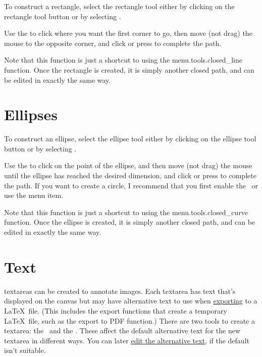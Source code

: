 To construct a rectangle, select the rectangle tool either by
clicking on the rectangle tool button or by selecting
.

Use the  to click where
you want the first corner to go, then move (not drag) the mouse to
the opposite corner, and \gls{click} or press
 to complete the \gls{path}.

Note that this function is just a shortcut to using the
\gls{menu.tools.closed_line} function. Once the rectangle is
created, it is simply another closed \gls{path}, and can be edited in
exactly the same way.



\section{Ellipses}\label{sec:ellipses}


To construct an ellipse, select the ellipse tool either by clicking
on the ellipse tool button or by selecting
.

Use the  to click on the
 point of the ellipse, and then move (not drag) the mouse
until the ellipse has reached the desired dimension, and \gls{click}
or press  to complete the \gls{path}. If you want
to create a circle, I recommend that you first enable the \gridlock\ or use the
 menu item.

Note that this function is just a shortcut to using the
\gls{menu.tools.closed_curve} function. Once the ellipse is
created, it is simply another closed \gls{path}, and can be edited in
exactly the same way.


\section{Text}\label{sec:newtext}

\Glspl{textarea} can be created to annotate images. Each
\gls*{textarea} has text that's displayed on the \gls{canvas} but
may have alternative text to use when
\hyperref[sec:exportimage]{exporting} to a \LaTeX\ file. (This includes
the export functions that create a temporary \LaTeX\ file, such as
the export to PDF function.) There are two tools to create a
\gls*{textarea}: the \texttool\ and the \mathstool. These
affect the default alternative text for the new \gls*{textarea} in
different ways. You can later \hyperref[sec:edittext]{edit the
alternative text}, if the default isn't suitable.

